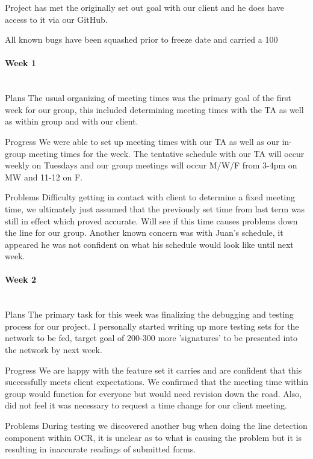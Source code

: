 \documentclass[article, onecolumn, draftclsnofoot,10pt, compsoc]{IEEEtran}
\begin{document}
Project has met the originally set out goal with our client and he does have access to it via our GitHub.
 
All known bugs have been squashed prior to freeze date and carried a 100%


\paragraph{Week 1}
\mbox{}\\
Plans
The usual organizing of meeting times was the primary goal of the first week for our group, this included determining meeting times with the TA as well as within group and with our client. 
 
Progress
We were able to set up meeting times with our TA as well as our in-group meeting times for the week. The tentative schedule with our TA will occur weekly on Tuesdays and our group meetings will occur M/W/F from 3-4pm on MW and 11-12 on F.
 
Problems
Difficulty getting in contact with client to determine a fixed meeting time, we ultimately just assumed that the previously set time from last term was still in effect which proved accurate. Will see if this time causes problems down the line for our group. Another known concern was with Juan's schedule, it appeared he was not confident on what his schedule would look like until next week.

\paragraph{Week 2}
\mbox{}\\
Plans
The primary task for this week was finalizing the debugging and testing process for our project. I personally started writing up more testing sets for the network to be fed, target goal of 200-300 more 'signatures' to be presented into the network by next week.
 
Progress
We are happy with the feature set it carries and are confident that this successfully meets client expectations. We confirmed that the meeting time within group would function for everyone but would need revision down the road. Also, did not feel it was necessary to request a time change for our client meeting.
 
Problems
During testing we discovered another bug when doing the line detection component within OCR, it is unclear as to what is causing the problem but it is resulting in inaccurate readings of submitted forms.
\end{document}
